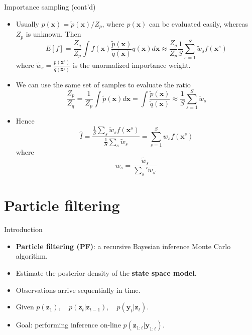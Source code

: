 \documentclass[10pt,mathserif]{beamer}
\begin{document}
\begin{frame}{Importance sampling (cont'd)}
\begin{itemize}
    \item Usually $p(\bm{x}) =  \tilde{p}(\bm{x})/Z_p$, where $p(\bm{x})$ can be evaluated easily, whereas $Z_p$ is unknown. Then
    \begin{equation*} 
        E[f] = \frac{Z_q}{Z_p}\int f(\bm{x})\frac{\tilde{p}(\bm{x})}{\tilde{q}(\bm{x})}q(\bm{x}) d\bm{x} \approx \frac{Z_q}{Z_p}\frac{1}{S}\sum_{s=1}^S \tilde{w}_s f(\bm{x}^s)
    \end{equation*} 
    where $\tilde{w}_s = \frac{\tilde{p}(\bm{x}^s)}{\tilde{q}(\bm{x}^s)}$ is the unormalized importance weight.
    \item We can use the same set of samples to evaluate the ratio
    \begin{equation*} 
        \frac{Z_p}{Z_q} = \frac{1}{Z_p}\int\tilde{p}(\bm{x})d\bm{x} = \int\frac{\tilde{p}(\bm{x})}{\tilde{q}(\bm{x})} \approx \frac{1}{S}\sum_{s=1}^S \tilde{w}_s
    \end{equation*} 
    \item Hence
    \begin{equation*} 
        \hat{I} = \frac{\frac{1}{S}\sum_s \tilde{w}_s f(\bm{x}^s)}{\frac{1}{S}\sum_s \tilde{w}_s} =  \sum_{s = 1}^S w_s f(\bm{x}^s)
    \end{equation*} 
    where
    \begin{equation*} 
        w_s = \frac{\tilde{w}_s}{\sum_s' \tilde{w}_{s'}}
    \end{equation*} 
\end{itemize}    
\end{frame}

\section{Particle filtering}
\begin{frame}{Introduction}
\begin{itemize}
    \item \textbf{Particle filtering (PF)}: a recursive Bayesian inference Monte Carlo algorithm.
    \item Estimate the posterior density of the \textbf{state space model}.
    \item Observations arrive sequentially in time.
    \item Given $p(\bm{z}_1), \quad p(\bm{z}_t|\bm{z}_{t-1}), \quad  p(\bm{y}_t|\bm{z}_t)$.
    \item Goal: performing inference on-line $p(\bm{z}_{1:t}|\bm{y}_{1:t})$.
\end{itemize}    
\end{frame}
\end{document}
